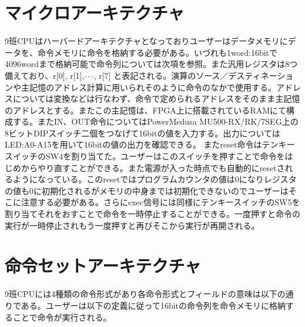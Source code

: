 \documentclass[a4paper,11pt,oneside,openany]{jsarticle}
\begin{document}
\section{マイクロアーキテクチャ}
9班CPUはハーバードアーキテクチャとなっておりユーザーはデータメモリにデータを、命令メモリに命令を格納する必要がある。いづれも1word:16bitで4096wordまで格納可能で命令列については次項を参照。また汎用レジスタは8つ備えており、r[0], r[1],$\cdot\cdot\cdot$, r[7] と表記される。演算のソース／デスティネーションや主記憶のアドレス計算に用いられそのように命令のなかで使用する。アドレスについては変換などは行なわず、命令で定められるアドレスをそのまま主記憶のアドレスとする。またこの主記憶は、FPGA上に搭載されているRAMにて構成する。またIN、OUT命令についてはPowerMedusa MU500-RX/RK/7SEG上の8ビットDIPスイッチ二個をつなげて16bitの値を入力する。出力についてはLED:A0-A15を用いて16bitの値の出力を確認できる。
またreset命令はテンキースイッチのSW4を割り当てた。ユーザーはこのスイッチを押すことで命令をはじめからやり直すことができる。また電源が入った時点でも自動的にresetされるようになっている。このresetではプログラムカウンタの値は0になりレジスタの値も0に初期化されるがメモリの中身までは初期化できないのでユーザーはそこに注意する必要がある。さらにexec信号には同様にテンキースイッチのSW5を割り当てそれをおすことで命令を一時停止することができる。一度押すと命令の実行が一時停止されもう一度押すと再びそこから実行が再開される。

\newpage



\section{命令セットアーキテクチャ}
9班CPUには4種類の命令形式があり各命令形式とフィールドの意味は以下の通りである。ユーザーは以下の定義に従って16bitの命令列を命令メモリに格納することで命令が実行される。
\end{document}
